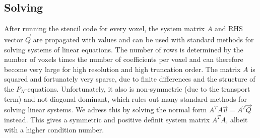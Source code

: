 \begin{figure}[h]
\begin{subfigure}{0.45\columnwidth}
\end{subfigure}%
\vspace{-0.1in}
\label{fig:artifacts}
\end{figure}



\subsection{Solving}

After running the stencil code for every voxel, the system matrix $A$
and RHS vector $\vec{Q}$ are propagated with values and can be used with standard methods for solving systems of linear equations. The number of rows is determined by the number of voxels times the number of coefficients per voxel and can therefore become very large for high resolution and high truncation order. The matrix $A$ is squared and fortunately very sparse, due to finite differences and the structure of the $P_N$-equations. Unfortunately, it also is non-symmetric (due to the transport term) and not diagonal dominant, which rules out many standard methods for solving linear systems. We adress this by solving the normal form $A^TA\vec{u}=A^T\vec{Q}$ instead. This gives a symmetric and positive definit system matrix $A^TA$, albeit with a higher condition number.



\begin{figure}[h]
\centering
\begin{subfigure}{0.45\columnwidth}
\end{subfigure}%
\hspace{0.05\columnwidth}
\begin{subfigure}{0.45\columnwidth}
\end{subfigure}%
\vspace{-0.2in}
\label{fig:staggeredgrid}
\end{figure}





